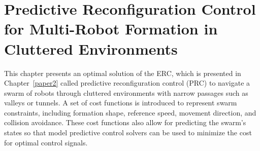 \chapter{Predictive Reconfiguration Control for Multi-Robot Formation in Cluttered Environments}\label{paper3}

\vspace{1cm}




This chapter presents an optimal solution of the ERC, which is presented in Chapter~\ref{paper2} called predictive reconfiguration control (PRC) to navigate a swarm of robots through cluttered environments with narrow passages such as valleys or tunnels. A set of cost functions is introduced to represent swarm constraints, including formation shape, reference speed, movement direction, and collision avoidance. These cost functions also allow for predicting the swarm's states so that model predictive control solvers can be used to minimize the cost for optimal control signals.







